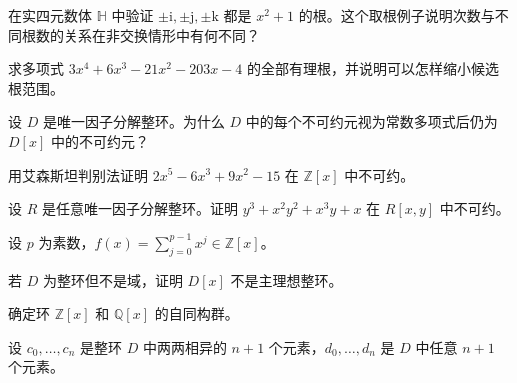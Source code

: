 \noindent\begin{minipage}{\textwidth}
在实四元数体 $\mathbb{H}$ 中验证 $\pm\mathrm{i},\pm\mathrm{j},\pm\mathrm{k}$ 都是 $x^2+1$ 的根。这个取根例子说明次数与不同根数的关系在非交换情形中有何不同？
\end{minipage}\par\vfill
\noindent\begin{minipage}{\textwidth}
求多项式 $3x^4+6x^3-21x^2-203x-4$ 的全部有理根，并说明可以怎样缩小候选根范围。
\end{minipage}\par\vfill
\newpage
\noindent\begin{minipage}{\textwidth}
设 $D$ 是唯一因子分解整环。为什么 $D$ 中的每个不可约元视为常数多项式后仍为 $D[x]$ 中的不可约元？
\end{minipage}\par\vfill
\noindent\begin{minipage}{\textwidth}
用艾森斯坦判别法证明 $2x^5-6x^3+9x^2-15$ 在 $\mathbb{Z}[x]$ 中不可约。
\end{minipage}\par\vfill
\noindent\begin{minipage}{\textwidth}
设 $R$ 是任意唯一因子分解整环。证明 $y^3+x^2y^2+x^3y+x$ 在 $R[x,y]$ 中不可约。
\end{minipage}\par\vfill
\newpage
\noindent\begin{minipage}{\textwidth}
设 $p$ 为素数，$f(x)=\sum_{j=0}^{p-1}x^j\in\mathbb{Z}[x]$。
\end{minipage}\par\vfill
\noindent\begin{minipage}{\textwidth}
若 $D$ 为整环但不是域，证明 $D[x]$ 不是主理想整环。
\end{minipage}\par\vfill
\noindent\begin{minipage}{\textwidth}
确定环 $\mathbb{Z}[x]$ 和 $\mathbb{Q}[x]$ 的自同构群。
\end{minipage}\par\vfill
\newpage
\noindent\begin{minipage}{\textwidth}
设 $c_0,\dots,c_n$ 是整环 $D$ 中两两相异的 $n+1$ 个元素，$d_0,\dots,d_n$ 是 $D$ 中任意 $n+1$ 个元素。
\end{minipage}\par\vfill
